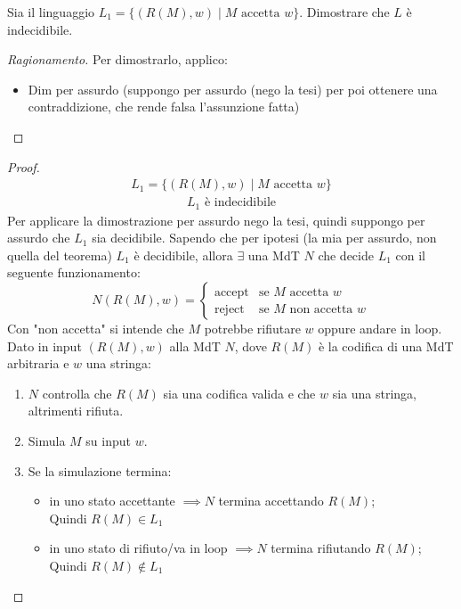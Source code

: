\documentclass{article}  %
\theoremstyle{definition}
\newenvironment{ragionamento}[1][]
  {\begin{proof}[Ragionamento#1]\renewcommand{\qedsymbol}{}\normalfont}
  {\end{proof}}
\begin{document}
\begin{esercizio}[Esercizio 2.2]
	\footnotesize %
	Sia il linguaggio $L_1 = \{(R(M), w) \mid M \text{ accetta } w\}$. Dimostrare che $L$ è indecidibile.
	\begin{ragionamento}
		Per dimostrarlo, applico:
		\begin{itemize}
			\item Dim per assurdo (suppongo per assurdo (nego la tesi) per poi ottenere una contraddizione, che rende falsa l'assunzione fatta)
		\end{itemize}
	\end{ragionamento}
	\begin{proof}
		\begin{align*}
			L_1 = \{(R(M), w) \mid M \text{ accetta } w\} \tag*{(ipotesi)}
		\end{align*}
		\begin{align*}
			L_1 \text{ è indecidibile} \tag*{(tesi)}
		\end{align*}
		Per applicare la dimostrazione per assurdo nego la tesi, quindi suppongo per assurdo che $L_1$ sia decidibile.
		Sapendo che per ipotesi (la mia per assurdo, non quella del teorema) $L_1$ è decidibile, allora $\exists$ una MdT $N$ che decide $L_1$ con il seguente funzionamento:
		\[
			N(R(M),w) =
			\begin{cases}
				\text{accept} & \text{se } M \text{ accetta } w     \\
				\text{reject} & \text{se } M \text{ non accetta } w
			\end{cases}
		\]
		Con "non accetta" si intende che $M$ potrebbe rifiutare $w$ oppure andare in loop.\\
		Dato in input $(R(M),w)$ alla MdT $N$, dove $R(M)$ è la codifica di una MdT arbitraria e $w$ una stringa:
		\begin{enumerate}
			\item $N$ controlla che $R(M)$ sia una codifica valida e che $w$ sia una stringa, altrimenti rifiuta.
			\item Simula $M$ su input $w$.
			\item Se la simulazione termina:
			      \begin{itemize}
				      \item in uno stato accettante $\implies N$ termina accettando $R(M)$; \\ Quindi $R(M) \in L_1$
				      \item in uno stato di rifiuto/va in loop $\implies N$ termina rifiutando $R(M)$; \\ Quindi $R(M) \notin L_1$

\end{itemize}
\end{enumerate}
\end{proof}
\end{esercizio}
\end{document}
